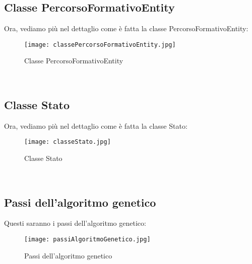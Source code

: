 \documentclass[10pt,a4paper]{article}
\begin{document}
     \subsection{Classe PercorsoFormativoEntity}
       \label{classePercorsoFormativoEntitySubsection}
       Ora, vediamo più nel dettaglio come è fatta la classe PercorsoFormativoEntity:\\
       \begin{figure}[h!]
         \centering
         \caption{Classe PercorsoFormativoEntity}
         \texttt{[image: classePercorsoFormativoEntity.jpg]}
         \label{classePercorsoFormativoEntity}
       \end{figure}\\
      
     \subsection{Classe Stato}
       \label{classeStatoSubsection}
       Ora, vediamo più nel dettaglio come è fatta la classe Stato:\\
       \begin{figure}[h!]
         \centering
         \caption{Classe Stato}
         \texttt{[image: classeStato.jpg]}
         \label{classeStato}
       \end{figure}\\
      
      \newpage
      
    \subsection{Passi dell'algoritmo genetico}
      \label{passiDellAlgoritmoGeneticoSubsection}
      Questi saranno i passi dell'algoritmo genetico:
      \begin{figure}[h!]
        \centering
        \caption{Passi dell'algoritmo genetico}
        \texttt{[image: passiAlgoritmoGenetico.jpg]}
        \label{passiAlgoritmoGenetico}
      \end{figure}\\
            
\end{document}
